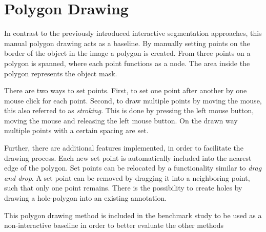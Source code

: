 
\section{Polygon Drawing}\label{ord:ch3:sec1}

In contrast to the previously introduced interactive segmentation approaches, this manual polygon drawing acts as a baseline.
By manually setting points on the border of the object in the image a polygon is created.
From three points on a polygon is spanned, where each point functions as a node.
The area inside the polygon represents the object mask.

There are two ways to set points.
First, to set one point after another by one mouse click for each point.
Second, to draw multiple points by moving the mouse, this also referred to as \textit{stroking}.
This is done by pressing the left mouse button, moving the mouse and releasing the left mouse button.
On the drawn way multiple points with a certain spacing are set.

Further, there are additional features implemented, in order to facilitate the drawing process.
Each new set point is automatically included into the nearest edge of the polygon.
Set points can be relocated by a functionality similar to \textit{drag and drop}.
A set point can be removed by dragging it into a neighboring point, such that only one point remains.
There is the possibility to create holes by drawing a hole-polygon into an existing annotation.

This polygon drawing method is included in the benchmark study to be used as a non-interactive baseline in order to better evaluate the other methods